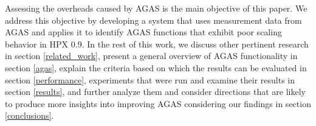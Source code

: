 Assessing the overheads caused by AGAS is the main objective of this paper. We
address this objective by developing a system that uses measurement data from
AGAS and applies it to identify AGAS functions that exhibit poor scaling
behavior in HPX 0.9. In the rest of this work, we discuss other pertinent
research in section \ref{related_work}, present a general overview of AGAS
functionality in section \ref{agas}, explain the criteria based on which the
results can be evaluated in section \ref{performance}, experiments that were
run and examine their results in section \ref{results}, and further analyze
them and consider directions that are likely to produce more insights into
improving AGAS considering our findings in section \ref{conclusions}.
